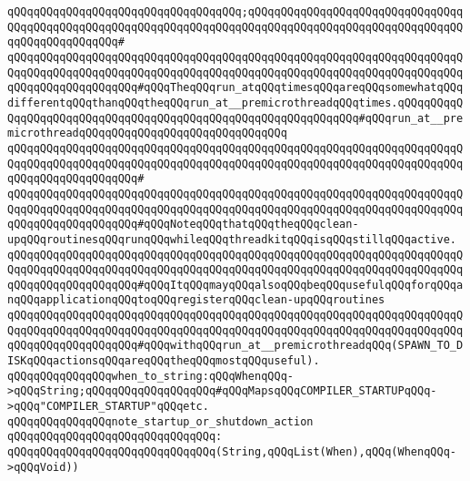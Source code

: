 \verb|qQQqqQQqqQQqqQQqqQQqqQQqqQQqqQQqqQQq;qQQqqQQqqQQqqQQqqQQqqQQqqQQqqQQqqQQqqQQqqQQqqQQqqQQqqQQqqQQqqQQqqQQqqQQqqQQqqQQqqQQqqQQqqQQqqQQqqQQqqQQqqQQqqQQqqQQqqQQq#|\newline
\verb|qQQqqQQqqQQqqQQqqQQqqQQqqQQqqQQqqQQqqQQqqQQqqQQqqQQqqQQqqQQqqQQqqQQqqQQqqQQqqQQqqQQqqQQqqQQqqQQqqQQqqQQqqQQqqQQqqQQqqQQqqQQqqQQqqQQqqQQqqQQqqQQqqQQqqQQqqQQqqQQq#qQQqTheqQQqrun_atqQQqtimesqQQqareqQQqsomewhatqQQqdifferentqQQqthanqQQqtheqQQqrun_at__premicrothreadqQQqtimes.qQQqqQQqqQQqqQQqqQQqqQQqqQQqqQQqqQQqqQQqqQQqqQQqqQQqqQQqqQQqqQQq#qQQqrun_at__premicrothreadqQQqqQQqqQQqqQQqqQQqqQQqqQQqqQQq|\newline
\verb|qQQqqQQqqQQqqQQqqQQqqQQqqQQqqQQqqQQqqQQqqQQqqQQqqQQqqQQqqQQqqQQqqQQqqQQqqQQqqQQqqQQqqQQqqQQqqQQqqQQqqQQqqQQqqQQqqQQqqQQqqQQqqQQqqQQqqQQqqQQqqQQqqQQqqQQqqQQqqQQq#|\newline
\verb|qQQqqQQqqQQqqQQqqQQqqQQqqQQqqQQqqQQqqQQqqQQqqQQqqQQqqQQqqQQqqQQqqQQqqQQqqQQqqQQqqQQqqQQqqQQqqQQqqQQqqQQqqQQqqQQqqQQqqQQqqQQqqQQqqQQqqQQqqQQqqQQqqQQqqQQqqQQqqQQq#qQQqNoteqQQqthatqQQqtheqQQqclean-upqQQqroutinesqQQqrunqQQqwhileqQQqthreadkitqQQqisqQQqstillqQQqactive.|\newline
\verb|qQQqqQQqqQQqqQQqqQQqqQQqqQQqqQQqqQQqqQQqqQQqqQQqqQQqqQQqqQQqqQQqqQQqqQQqqQQqqQQqqQQqqQQqqQQqqQQqqQQqqQQqqQQqqQQqqQQqqQQqqQQqqQQqqQQqqQQqqQQqqQQqqQQqqQQqqQQqqQQq#qQQqItqQQqmayqQQqalsoqQQqbeqQQqusefulqQQqforqQQqanqQQqapplicationqQQqtoqQQqregisterqQQqclean-upqQQqroutines|\newline
\verb|qQQqqQQqqQQqqQQqqQQqqQQqqQQqqQQqqQQqqQQqqQQqqQQqqQQqqQQqqQQqqQQqqQQqqQQqqQQqqQQqqQQqqQQqqQQqqQQqqQQqqQQqqQQqqQQqqQQqqQQqqQQqqQQqqQQqqQQqqQQqqQQqqQQqqQQqqQQqqQQq#qQQqwithqQQqrun_at__premicrothreadqQQq(SPAWN_TO_DISKqQQqactionsqQQqareqQQqtheqQQqmostqQQquseful).|\newline
\newline
\newline
\verb|qQQqqQQqqQQqqQQqwhen_to_string:qQQqWhenqQQq->qQQqString;qQQqqQQqqQQqqQQqqQQq#qQQqMapsqQQqCOMPILER_STARTUPqQQq->qQQq"COMPILER_STARTUP"qQQqetc.|\newline
\newline
\verb|qQQqqQQqqQQqqQQqnote_startup_or_shutdown_action|\newline
\verb|qQQqqQQqqQQqqQQqqQQqqQQqqQQqqQQq:|\newline
\verb|qQQqqQQqqQQqqQQqqQQqqQQqqQQqqQQq(String,qQQqList(When),qQQq(WhenqQQq->qQQqVoid))|\newline
